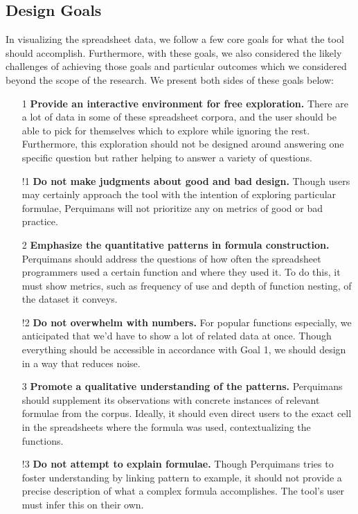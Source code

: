 \documentclass[conference]{IEEEtran}
\newcommand{\toolname}{Perquimans }
\begin{document}
	\subsection{Design Goals} \label{goals} In visualizing the spreadsheet data, we
	follow a few core goals for what the tool should accomplish. Furthermore, with
	these goals, we also considered the likely challenges of achieving those goals
	and particular outcomes which we considered beyond the scope of the research.
	We present both sides of these goals below:
	
	\begin{itemize}
		
		\item [1] \textbf{Provide an interactive environment for free exploration.}
		There are a lot of data in some of these spreadsheet corpora, and the user should be
		able to pick for themselves which to explore while ignoring the rest.
		Furthermore, this exploration should not be designed around answering one
		specific question but rather helping to answer a variety of questions.
		
		\item [!1] \textbf{Do not make judgments about good and bad design.} Though
		users may certainly approach the tool with the intention of exploring particular
		formulae, \toolname will not prioritize any on metrics of good or bad
		practice. 
		
		\item [2] \textbf{Emphasize the quantitative patterns in formula
			construction.} \toolname should address the questions of how often the
		spreadsheet programmers used a certain function and where they used it. To do
		this, it must show metrics, such as frequency of use and depth of
		function nesting, of the dataset it conveys.
		
		\item [!2] \textbf{Do not overwhelm with numbers.} For popular functions
		especially, we anticipated that we'd have to show a lot of related data
		at once. Though everything
		should be accessible in accordance with Goal 1, we should design in a way that
		reduces noise.
		
		\item [3] \textbf{Promote a qualitative understanding of the patterns.}
		\toolname should supplement its observations with concrete instances of
		relevant formulae from the corpus. Ideally, it should even direct users to the
		exact cell in the spreadsheets where the formula was used, contextualizing the
		functions.
		
		\item [!3] \textbf{Do not attempt to explain formulae.} Though \toolname tries
		to foster understanding by linking pattern to example, it should not provide a
		precise description of what a complex formula accomplishes. The tool's user
		must infer this on their own.
		
	\end{itemize}
	
\end{document}
